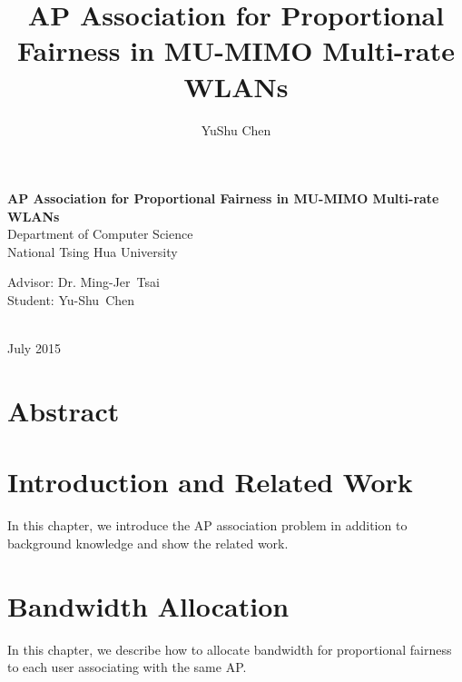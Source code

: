 \documentclass[a4paper, 12pt]{report}
\title{AP Association for Proportional Fairness in MU-MIMO Multi-rate WLANs}
\author{YuShu Chen}
\newcommand{\doublespace}{\addtolength{\baselineskip}{.6\baselineskip}}
\begin{document}
	\begin{titlepage}
		\begin{center}
			\Large{\bf{AP Association for Proportional Fairness in MU-MIMO Multi-rate WLANs\\}}
			\vspace{3cm}
			Department of Computer Science\\
			National Tsing Hua University\\
			\vspace{2cm}
			\vspace{4.5cm}
			\parbox[t]{7cm}{
				Advisor: Dr. Ming-Jer~Tsai\\
				Student: Yu-Shu~Chen\\
			} \\
			\vspace{5cm}
			July 2015\\
		\end{center}
	\end{titlepage}
	\doublespace
	\chapter*{Abstract}
		
	\tableofcontents
	\cleardoublepage
	
	\listoffigures
	\cleardoublepage

	\listoftables
	\cleardoublepage
		
	\chapter{Introduction and Related Work}
		In this chapter, we introduce the AP association problem in addition to background knowledge and show the related work.
		
		
	\chapter{Bandwidth Allocation}
		In this chapter, we describe how to allocate bandwidth for proportional fairness to each user associating with the same AP.
		
\end{document}
